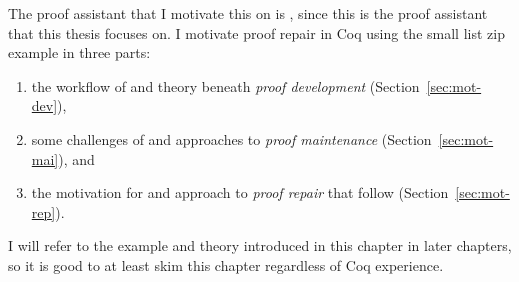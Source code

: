 The proof assistant that I motivate this on is , since this is the proof assistant that this thesis focuses on.
I motivate proof repair in Coq using the small list zip example in three parts:

\begin{enumerate}
\item the workflow of and theory beneath \textit{proof development} (Section~\ref{sec:mot-dev}),
\item some challenges of and approaches to \textit{proof maintenance} (Section~\ref{sec:mot-mai}), and
\item the motivation for and approach to \textit{proof repair} that follow (Section~\ref{sec:mot-rep}).
\end{enumerate}
I will refer to the example and theory introduced in this chapter in later chapters, so it is good to at least skim this chapter regardless of Coq experience.









